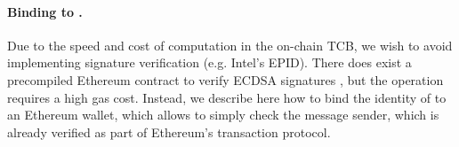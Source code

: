 %
%


\paragraph{Binding \tcboff to \tcadd.}
Due to the speed and cost of computation in the on-chain TCB, we wish to avoid implementing signature verification (e.g. Intel's EPID).
There does exist a precompiled Ethereum contract to verify ECDSA signatures \cite{yellowpaper}, but the operation requires a high gas cost.
Instead, we describe here how to bind the identity of \tcboff to an Ethereum wallet, which allows \tcbon to simply check the message sender,
which is already verified as part of Ethereum's transaction protocol.

